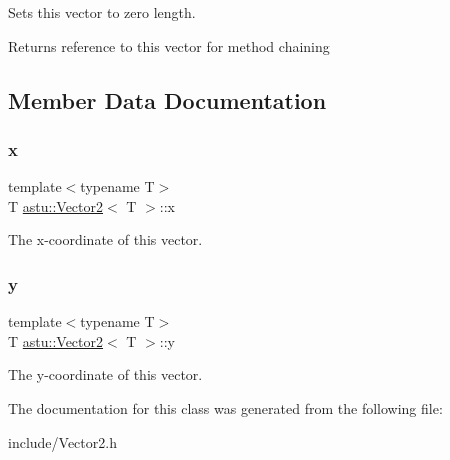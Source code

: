 Sets this vector to zero length.

\begin{DoxyReturn}{Returns}
reference to this vector for method chaining 
\end{DoxyReturn}


\subsection{Member Data Documentation}
\mbox{\label{classastu_1_1Vector2_aa60c30b27742255fbe7053b07a7e76ba}} 
\subsubsection{\texorpdfstring{x}{x}}
{\footnotesize\ttfamily template$<$typename T$>$ \\
T \hyperlink{classastu_1_1Vector2}{astu\+::\+Vector2}$<$ T $>$\+::x}

The x-\/coordinate of this vector. \mbox{\label{classastu_1_1Vector2_a6718f5a7005c38830dbd31283a87f5c9}} 
\subsubsection{\texorpdfstring{y}{y}}
{\footnotesize\ttfamily template$<$typename T$>$ \\
T \hyperlink{classastu_1_1Vector2}{astu\+::\+Vector2}$<$ T $>$\+::y}

The y-\/coordinate of this vector. 

The documentation for this class was generated from the following file\+:\begin{DoxyCompactItemize}
\item 
include/Vector2.\+h\end{DoxyCompactItemize}
